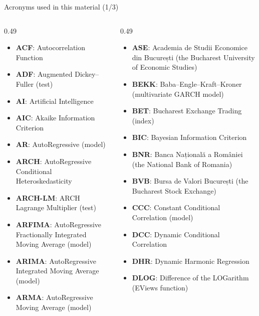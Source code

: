 {
\begin{frame}[noframenumbering]
    \titlepage
\end{frame}
}
\begin{frame}{Acronyms used in this material (1/3)}
\begin{columns}[T]
\begin{column}{0.49\textwidth}
\begin{itemize}\setlength{\itemsep}{0pt}
    \item \textbf{ACF}: Autocorrelation Function
    \item \textbf{ADF}: Augmented Dickey–Fuller (test)
    \item \textbf{AI}: Artificial Intelligence
    \item \textbf{AIC}: Akaike Information Criterion
    \item \textbf{AR}: AutoRegressive (model)
    \item \textbf{ARCH}: AutoRegressive Conditional Heteroskedasticity
    \item \textbf{ARCH-LM}: ARCH Lagrange Multiplier (test)
    \item \textbf{ARFIMA}: AutoRegressive Fractionally Integrated Moving Average (model)
    \item \textbf{ARIMA}: AutoRegressive Integrated Moving Average (model)
    \item \textbf{ARMA}: AutoRegressive Moving Average (model)
\end{itemize}
\end{column}
\begin{column}{0.49\textwidth}
\begin{itemize}\setlength{\itemsep}{0pt}
    \item \textbf{ASE}: Academia de Studii Economice din București (the Bucharest University of Economic Studies)
    \item \textbf{BEKK}: Baba–Engle–Kraft–Kroner (multivariate GARCH model)
    \item \textbf{BET}: Bucharest Exchange Trading (index)
    \item \textbf{BIC}: Bayesian Information Criterion
    \item \textbf{BNR}: Banca Națională a României (the National Bank of Romania)
    \item \textbf{BVB}: Bursa de Valori București (the Bucharest Stock Exchange)
    \item \textbf{CCC}: Constant Conditional Correlation (model)
    \item \textbf{DCC}: Dynamic Conditional Correlation
    \item \textbf{DHR}: Dynamic Harmonic Regression
    \item \textbf{DLOG}: Difference of the LOGarithm (EViews function)
\end{itemize}
\end{column}
\end{columns}
\end{frame}
